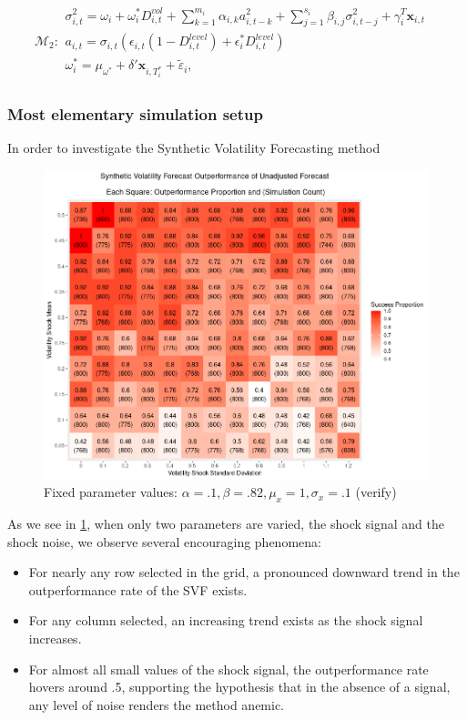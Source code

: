 \documentclass[11pt]{article}
\newcommand{\x}{\textbf{x}}
\def\mbf#1{\mathbf{#1}} %
\def\t#1{\tilde{#1}} %
\def\mc#1{\mathcal{#1}} %
\def\mc#1{\mathcal{#1}}
\theoremstyle{definition}
\begin{document}
\begin{align*}
\mc{M}_2 \colon \begin{array}{l}
   \sigma^{2}_{i,t} = \omega_{i} + \omega^{*}_i D^{vol}_{i,t} + \sum^{m_{i}}_{k=1}\alpha_{i,k}a^{2}_{i,t-k} + \sum_{j=1}^{s_{i}}\beta_{i,j}\sigma_{i,t-j}^{2} + \gamma_{i}^{T} \x_{i,t} \text{ }\\[.2cm]
   a_{i,t} = \sigma_{i,t}(\epsilon_{i,t}(1-D^{level}_{i,t}) + \epsilon^{*}_{i}D^{level}_{i,t})\\[.2cm]
   \omega_i^{*} = \mu_{\omega^{*}}+\delta'\mbf{x}_{i, T_i^*}+ \t{\varepsilon}_{i},
\end{array}
\end{align*}

\subsubsection{Most elementary simulation setup}

In order to investigate the Synthetic Volatility Forecasting method

\begin{figure}[h!]
\begin{center}
  \includegraphics[scale=.45]{simulation_plots/outperformance_grid.png}
  \caption{Fixed parameter values: $\alpha = .1, \beta = .82, \mu_{x} = 1, \sigma_{x} = .1$ (verify)}
  \label{fig:outperformance}
\end{center}
\end{figure}

As we see in \ref{fig:outperformance}, when only two parameters are varied, the shock signal and the shock noise, we observe several encouraging phenomena:
\begin{itemize}
\item For nearly any row selected in the grid, a pronounced downward trend in the outperformance rate of the SVF exists.
\item For any column selected, an increasing trend exists as the shock signal increases.
\item For almost all small values of the shock signal, the outperformance rate hovers around .5, supporting the hypothesis that in the absence of a signal, any level of noise renders the method anemic.
\end{itemize}
\end{document}
